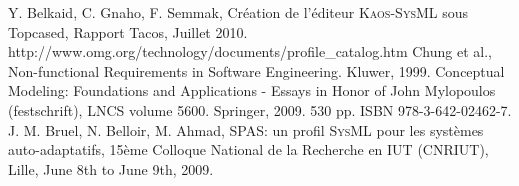 \documentclass[10pt, conference, compsocconf]{IEEEtran}
\def\sysml{\textsc{SysML}}
\def\kaos{\textsc{Kaos}}
\begin{document}
\begin{thebibliography}{1}
Y. Belkaid, C. Gnaho, F. Semmak, Cr\'eation de l'\'editeur \kaos{}-\sysml{} sous Topcased, Rapport Tacos, Juillet 2010.
http://www.omg.org/technology/documents/profile\_catalog.htm
Chung et al., Non-functional Requirements in Software Engineering. Kluwer, 1999.
Conceptual Modeling: Foundations and Applications - Essays in Honor of John Mylopoulos (festschrift), LNCS volume 5600. Springer, 2009.  530 pp. ISBN 978-3-642-02462-7.
J. M. Bruel, N. Belloir, M. Ahmad, SPAS: un profil \sysml{} pour les syst\`emes auto-adaptatifs, 15\`eme Colloque National de la Recherche en IUT (CNRIUT), Lille, June 8th to June 9th, 2009.


\end{thebibliography}




\end{document}
